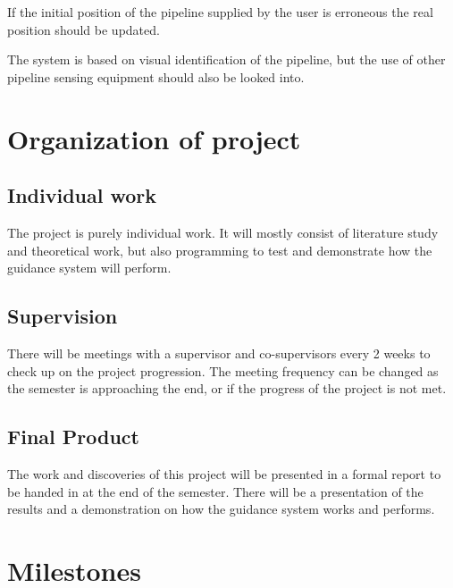 \documentclass[a4paper,10pt]{article}
\begin{document}
	If the initial position of the pipeline supplied by the user is erroneous the real position should be updated.
	
	The system is based on visual identification of the pipeline, but the use of other pipeline sensing equipment should also be looked into. 
	
\section{Organization of project}
	\subsection{Individual work}
	The project is purely individual work. It will mostly consist of literature study and theoretical work, but also programming to test and demonstrate how the guidance system will perform.
	
	\subsection{Supervision}
	There will be meetings with a supervisor and co-supervisors every 2 weeks to check up on the project progression. The meeting frequency can be changed as the semester is approaching the end, or if the progress of the project is not met.
	
	\subsection{Final Product}
	The work and discoveries of this project will be presented in a formal report to be handed in at the end of the semester. There will be a presentation of the results and a demonstration on how the guidance system works and performs.

\section{Milestones}
\end{document}
